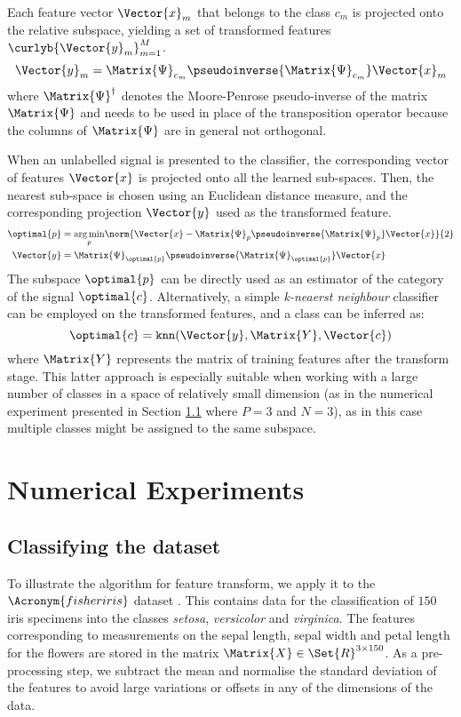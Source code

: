 \documentclass{article}
\def \fea{\Vector{x}} 	%
\def \Feas{\Matrix{X}} 	%
\def \iFea{n}	 		%
\def \nDim{N} 			%
\def \newFea{\Vector{y}} 	%
\def \NewFeas{\Matrix{Y}}%
\def \nFea{M}			%
\def \iFea{m}			%
\def \cat{c} 			%
\def \cats{\Vector{c}}	%
\def \iCat{p}  		%
\def \nCat{P} 		%
\def \ambient{\Set{R}} 						%
\def \Spa{\Matrix{\Psi}}
\begin{document}
Each feature vector $\fea_{\iFea}$ that belongs to the class $\cat_{\iFea}$ is projected onto the relative subspace, yielding a set of transformed features $\curlyb{\newFea_{\iFea}}_{\iFea=1}^{\nFea}$.
\begin{equation}
\newFea_{\iFea} = \Spa_{\cat_{\iFea}}\pseudoinverse{\Spa_{\cat_{\iFea}}}\fea_{\iFea}
\end{equation}
where $\Spa^{\dagger}$ denotes the Moore-Penrose pseudo-inverse of the matrix $\Spa$ and needs to be used in place of the transposition operator because the columns of $\Spa$ are in general not orthogonal.

When an unlabelled signal is presented to the classifier, the corresponding vector of features $\fea$ is projected onto all the learned sub-spaces. Then, the nearest sub-space is chosen using an Euclidean distance measure, and the corresponding projection $\newFea$ used as the transformed feature.
\begin{align}
	\optimal{\iCat} &= \underset{\iCat}{\arg\min}\norm{\fea-\Spa_{\iCat}\pseudoinverse{\Spa_{\iCat}}\fea}{2}	\\
	\newFea &= \Spa_{\optimal{\iCat}}\pseudoinverse{\Spa_{\optimal{\iCat}}}\fea
\end{align}
The subspace $\optimal{\iCat}$ can be directly used as an estimator of the category of the signal $\optimal{\cat}$. Alternatively, a simple \emph{k-neaerst neighbour} classifier can be employed on the transformed features, and a class can be inferred as:
\begin{equation}
\optimal{\cat} = \texttt{knn}(\newFea,\NewFeas,\cats)
\end{equation}
where $\NewFeas$ represents the matrix of training features after the transform stage. This latter approach is especially suitable when working with a large number of classes in a space of relatively small dimension (as in the numerical experiment presented in Section \ref{sec:fisher} where $\nCat=3$ and $\nDim=3$), as in this case multiple classes might be assigned to the same subspace.
\section{Numerical Experiments}\label{sec:ne}
\subsection{Classifying the  dataset}\label{sec:fisher}
To illustrate the  algorithm for feature transform, we apply it to the $\Acronym{fisheriris}$ dataset \cite{Fisher1936Th}. This contains data for the classification of $150$ iris specimens into the classes \emph{setosa}, \emph{versicolor} and \emph{virginica}. The features corresponding to measurements on the sepal length, sepal width and petal length for the flowers are stored in the matrix $\Feas\in\ambient^{3\times 150}$.  As a pre-processing step, we subtract the mean and normalise the standard deviation of the features to avoid large variations or offsets in any of the dimensions of the data.
\end{document}
